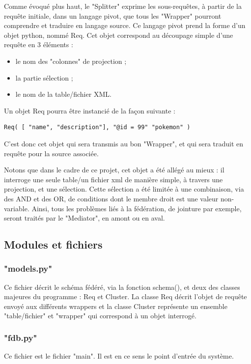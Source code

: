 Comme évoqué plus haut, le "Splitter" exprime les sous-requêtes, à partir de la requête initiale, dans un langage pivot, que tous les "Wrapper" pourront comprendre et traduire en langage source. Ce langage pivot prend la forme d'un objet python, nommé Req. Cet objet correspond au découpage simple d'une requête en 3 éléments :

\begin{itemize}
    \item le nom des "colonnes" de projection ;
    \item la partie sélection ;
    \item le nom de la table/fichier XML.
\end{itemize}

Un objet Req pourra être instancié de la façon suivante :

\begin{lstlisting}
Req( [ "name", "description"], "@id = 99" "pokemon" )
\end{lstlisting}

C’est donc cet objet qui sera transmis au bon "Wrapper", et qui sera traduit en requête pour la source associée.

Notons que dans le cadre de ce projet, cet objet a été allégé au mieux : il interroge une seule table/un fichier xml de manière simple, à travers une projection, et une sélection. Cette sélection a été limitée à une combinaison, via des AND et des OR, de conditions dont le membre droit est une valeur non-variable. Ainsi, tous les problèmes liés à la fédération, de jointure par exemple, seront traités par le "Mediator", en amont ou en aval.

\subsection{Modules et fichiers}

\subsubsection{"models.py"}
Ce fichier décrit le schéma fédéré, via la fonction schema(), et deux des classes majeures du programme : Req et Cluster. La classe Req décrit l'objet de requête envoyé aux différents wrappers et la classe Cluster représente un ensemble "table/fichier" et "wrapper" qui correspond à un objet interrogé.

\subsubsection{"fdb.py"}
Ce fichier est le fichier "main". Il est en ce sens le point d'entrée du système.

